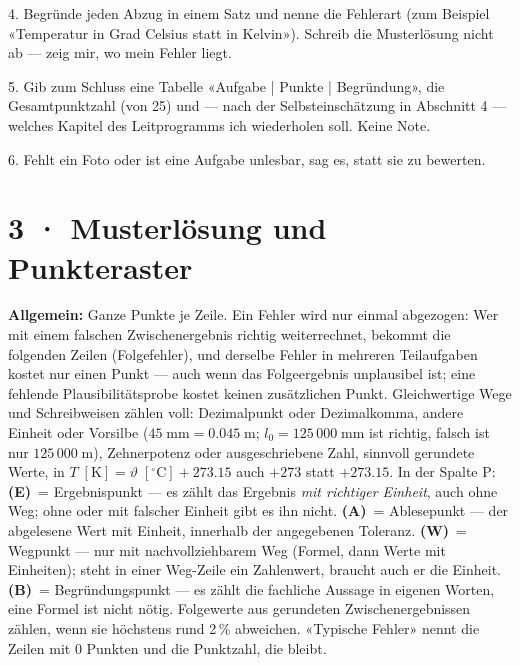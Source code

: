 \documentclass[11pt]{article}
\begin{document}
\begin{tcolorbox}[breakable,colback=lplinie!25,colframe=lplinie,boxrule=0.5pt,arc=1mm,fontupper=\small]
4. Begründe jeden Abzug in einem Satz und nenne die Fehlerart (zum Beispiel «Temperatur in Grad Celsius statt in Kelvin»). Schreib die Musterlösung nicht ab — zeig mir, wo mein Fehler liegt.\par
5. Gib zum Schluss eine Tabelle «Aufgabe | Punkte | Begründung», die Gesamtpunktzahl (von 25) und — nach der Selbsteinschätzung in Abschnitt 4 — welches Kapitel des Leitprogramms ich wiederholen soll. Keine Note.\par
6. Fehlt ein Foto oder ist eine Aufgabe unlesbar, sag es, statt sie zu bewerten.
\end{tcolorbox}

\section*{3 · Musterlösung und Punkteraster}
\textbf{Allgemein:} Ganze Punkte je Zeile. Ein Fehler wird nur einmal abgezogen: Wer mit einem falschen Zwischenergebnis
richtig weiterrechnet, bekommt die folgenden Zeilen (Folgefehler), und derselbe Fehler in mehreren Teilaufgaben kostet nur einen Punkt — auch wenn das Folgeergebnis unplausibel ist; eine fehlende
Plausibilitätsprobe kostet keinen zusätzlichen Punkt. Gleichwertige Wege und Schreibweisen zählen voll: Dezimalpunkt oder
Dezimalkomma, andere Einheit oder Vorsilbe (\(45\;\text{mm} = 0.045\;\text{m}\); \(l_0 = 125\,000\;\text{mm}\) ist richtig,
falsch ist nur \(125\,000\;\text{m}\)), Zehnerpotenz oder ausgeschriebene Zahl, sinnvoll gerundete Werte, in \(T\;[\text{K}] = \vartheta\;[^\circ\text{C}] + 273.15\) auch \(+ 273\) statt \(+ 273.15\).
In der Spalte P: \textbf{(E)}~= Ergebnispunkt — es zählt das Ergebnis \emph{mit richtiger Einheit}, auch ohne Weg; ohne oder mit
falscher Einheit gibt es ihn nicht. \textbf{(A)}~= Ablesepunkt — der abgelesene Wert mit Einheit, innerhalb der angegebenen Toleranz. \textbf{(W)}~= Wegpunkt — nur mit nachvollziehbarem Weg (Formel, dann Werte mit Einheiten);
steht in einer Weg-Zeile ein Zahlenwert, braucht auch er die Einheit. \textbf{(B)}~= Begründungspunkt — es zählt die fachliche
Aussage in eigenen Worten, eine Formel ist nicht nötig. Folgewerte aus gerundeten Zwischenergebnissen zählen, wenn sie höchstens rund 2\,\% abweichen.
«Typische Fehler» nennt die Zeilen mit 0 Punkten und die Punktzahl, die bleibt.
\end{document}
